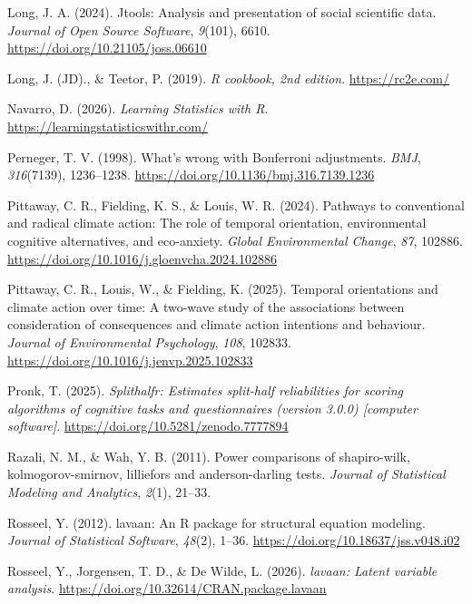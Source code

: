 \documentclass[
  letterpaper,
  DIV=11,
  numbers=noendperiod]{scrreprt}
\newlength{\cslhangindent}
\newenvironment{CSLReferences}[2] %
 {\begin{list}{}{%
  \setlength{\itemindent}{0pt}
  \setlength{\leftmargin}{0pt}
  \setlength{\parsep}{0pt}
  \ifodd #1
   \setlength{\leftmargin}{\cslhangindent}
   \setlength{\itemindent}{-1\cslhangindent}
  \fi
  \setlength{\itemsep}{#2\baselineskip}}}
 {\end{list}}
\begin{document}
\begin{CSLReferences}{1}{0}
Long, J. A. (2024). Jtools: Analysis and presentation of social
scientific data. \emph{Journal of Open Source Software}, \emph{9}(101),
6610. \url{https://doi.org/10.21105/joss.06610}

Long, J. (JD)., \& Teetor, P. (2019). \emph{R cookbook, 2nd edition}.
\url{https://rc2e.com/}

Navarro, D. (2026). \emph{Learning Statistics with R}.
\url{https://learningstatisticswithr.com/}

Perneger, T. V. (1998). What's wrong with Bonferroni adjustments.
\emph{BMJ}, \emph{316}(7139), 1236--1238.
\url{https://doi.org/10.1136/bmj.316.7139.1236}

Pittaway, C. R., Fielding, K. S., \& Louis, W. R. (2024). Pathways to
conventional and radical climate action: The role of temporal
orientation, environmental cognitive alternatives, and eco-anxiety.
\emph{Global Environmental Change}, \emph{87}, 102886.
\url{https://doi.org/10.1016/j.gloenvcha.2024.102886}

Pittaway, C. R., Louis, W., \& Fielding, K. (2025). Temporal
orientations and climate action over time: A two-wave study of the
associations between consideration of consequences and climate action
intentions and behaviour. \emph{Journal of Environmental Psychology},
\emph{108}, 102833. \url{https://doi.org/10.1016/j.jenvp.2025.102833}

Pronk, T. (2025). \emph{Splithalfr: Estimates split-half reliabilities
for scoring algorithms of cognitive tasks and questionnaires (version
3.0.0) {[}computer software{]}}.
\url{https://doi.org/10.5281/zenodo.7777894}

Razali, N. M., \& Wah, Y. B. (2011). Power comparisons of shapiro-wilk,
kolmogorov-smirnov, lilliefors and anderson-darling tests. \emph{Journal
of Statistical Modeling and Analytics}, \emph{2}(1), 21--33.

Rosseel, Y. (2012). {lavaan}: An {R} package for structural equation
modeling. \emph{Journal of Statistical Software}, \emph{48}(2), 1--36.
\url{https://doi.org/10.18637/jss.v048.i02}

Rosseel, Y., Jorgensen, T. D., \& De Wilde, L. (2026). \emph{{lavaan}:
Latent variable analysis}.
\url{https://doi.org/10.32614/CRAN.package.lavaan}


\end{CSLReferences}
\end{document}

